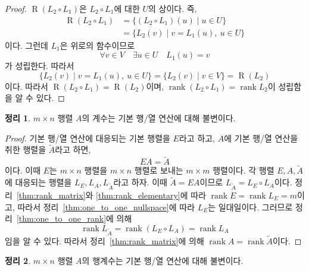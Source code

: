\documentclass[unfonts,oneside,a4paper]{oblivoir}
\theoremstyle{definition}
\theoremstyle{theorem}
\newtheorem{theorem}{정리}[section]
\theoremstyle{theorem}
\theoremstyle{remark}
\theoremstyle{remark}
\theoremstyle{remark}
\theoremstyle{remark}
\renewcommand{\vec}[1]{\bm{\mathit{#1}}}
\DeclareMathOperator{\Range}{R}
\DeclareMathOperator{\rank}{rank}
\begin{document}
\begin{proof}
    $\Range(L_2 \circ L_1)$은 $L_2 \circ L_1$에 대한 $U$의 상이다.
    즉,
    \begin{align*}
        \Range(L_2 \circ L_1) &= \{(L_2 \circ L_1)(\vec u) \mid \vec u \in U\}\\
                        &= \{L_2(\vec v) \mid \vec v = L_1(\vec u),\ \vec u \in U\}
    \end{align*}
    이다.
    그런데 $L_1$은 위로의 함수이므로
    \begin{equation*}
        \forall \vec v \in V \quad \exists \vec u \in U \quad L_1(\vec u) = \vec v
    \end{equation*}
    가 성립한다.
    따라서
    \begin{equation*}
        \{L_2(\vec v) \mid \vec v = L_1(\vec u),\ \vec u \in U\} = \{L_2(\vec v) \mid \vec v \in V\} = \Range(L_2)
    \end{equation*}
    이다.
    따라서 $\Range(L_2 \circ L_1) = \Range(L_2)$이며, $\rank(L_2 \circ L_1) = \rank L_2$이 성립함을 알 수 있다.
\end{proof}

\begin{theorem} \label{thm:elementary_op_rank}
    $m \times n$ 행렬 $A$의 계수는 기본 행/열 연산에 대해 불변이다.
\end{theorem}

\begin{proof}
    기본 행/열 연산에 대응되는 기본 행렬을 $E$라고 하고, $A$에 기본 행/열 연산을 취한 행렬을 $\tilde A$라고 하면,
    \begin{equation*}
        EA = \tilde A
    \end{equation*}
    이다.
    이때 $E$는 $m \times n$ 행렬을 $m \times n$ 행렬로 보내는 $m \times m$ 행렬이다.
    각 행렬 $E, A, \tilde A$에 대응되는 행렬을 $L_E, L_A, L_{\tilde A}$라고 하자.
    이때 $\tilde A = EA$이므로 $L_{\tilde A} = L_E \circ L_A$이다.
    정리~\ref{thm:rank_matrix}와 \ref{thm:rank_elementary}에 따라 $\rank E = \rank L_E = m$이고, 따라서 정리~\ref{thm:one_to_one_nullspace}에 따라 $L_E$는 일대일이다.
    그러므로 정리~\ref{thm:one_to_one_rank}에 의해
    \begin{equation*}
        \rank L_{\tilde A} = \rank (L_E \circ L_A) = \rank L_A
    \end{equation*}
    임을 알 수 있다.
    따라서 정리~\ref{thm:rank_matrix}에 의해 $\rank A = \rank \tilde A$이다.
\end{proof}

\begin{theorem} \label{thm:rowrankinvar}
    $m \times n$ 행렬 $A$의 행계수는 기본 행/열 연산에 대해 불변이다.
\end{theorem}
\end{document}

